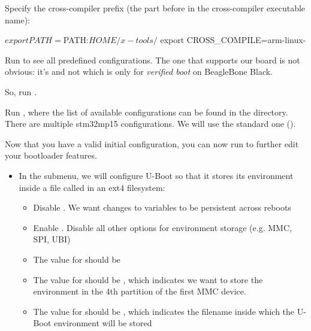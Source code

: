 \begin{enumerate}
\item Specify the cross-compiler prefix
(the part before  in the cross-compiler executable name):

\begin{bashinput}
$ export PATH=$PATH:$HOME/x-tools/%
$ export CROSS_COMPILE=arm-linux-
\end{bashinput}

{
\item Run  to see all predefined
      configurations. The one that supports our board is not obvious:
      it's  and not
       which is only for {\em
      verified boot} on BeagleBone Black.
\item So, run .
}{}

{
\item Run , where the list of available
  configurations can be found in the  directory. There
  are multiple stm32mp15 configurations. We will use the standard one
  ().
}{}

\item Now that you have a valid initial configuration, you can now
  run  to further edit your bootloader features.

  {
  \begin{itemize}

  \item In the  submenu, we will configure U-Boot so
    that it stores its environment inside a file called 
    in an ext4 filesystem:
    \begin{itemize}
    \item Disable . We want changes to variables to
        be persistent across reboots
    \item Enable . Disable all other
        options for environment storage (e.g. MMC, SPI, UBI)
    \item The value for  should be 
    \item The value for  should be , which indicates
      we want to store the environment in the 4th partition of the
      first MMC device.
    \item The value for  should be , which indicates the
      filename inside which the U-Boot environment will be stored
    \end{itemize}


\end{itemize}}
\end{enumerate}
